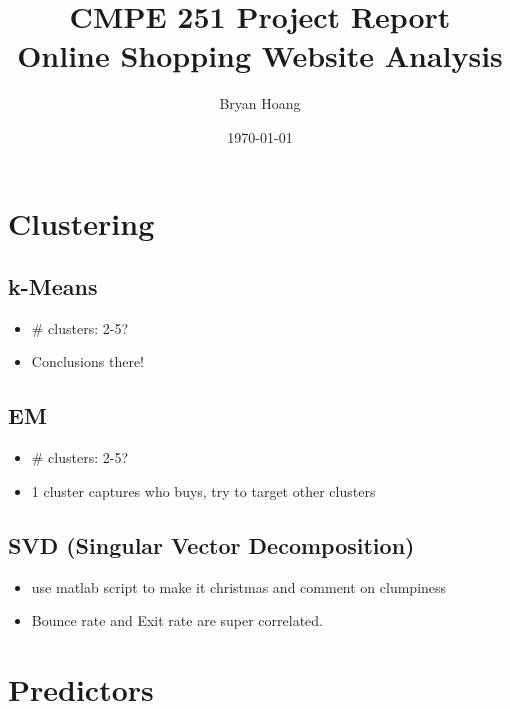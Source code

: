 \documentclass[
  draft,
]{memreport}
\title{
  \textbf{CMPE 251 Project Report}\\
  Online Shopping Website Analysis
}
\author{Bryan Hoang}
\date{\today}
\begin{document}
  \begin{titlingpage}
    \maketitle
  \end{titlingpage}

  \frontmatter{}

  \clearpage
  \tableofcontents
  \clearpage
  \listoffigures
  \clearpage
  \listoftables

  \mainmatter{}

  
  
  
  \chapter{Clustering}
  \section{k-Means}
  \begin{itemize}
    \item \# clusters: 2-5?
    \item Conclusions there!
  \end{itemize}

  \section{EM}
  \begin{itemize}
    \item \# clusters: 2-5?
    \item 1 cluster captures who buys, try to target other clusters
  \end{itemize}

  \section{SVD (Singular Vector Decomposition)}
  \begin{itemize}
    \item use matlab script to make it christmas and comment on clumpiness
    \item Bounce rate and Exit rate are super correlated.
  \end{itemize}

  \chapter{Predictors}
\end{document}
